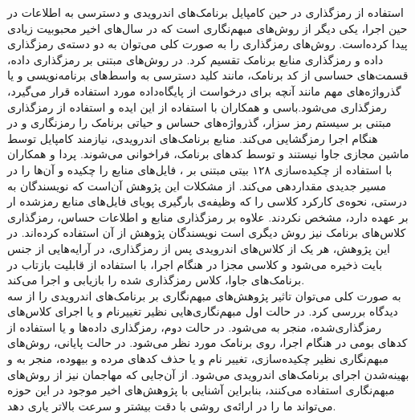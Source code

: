 استفاده از رمزگذاری در حین کامپایل برنامک‌های اندرویدی و دسترسی به اطلاعات در حین اجرا، یکی دیگر از روش‌های مبهم‌نگاری است که در سال‌های اخیر محبوبیت زیادی پیدا کرده‌است. روش‌های رمز‌گذاری را به صورت کلی می‌توان به دو دسته‌ی رمز‌گذاری داده و رمزگذاری منابع برنامک تقسیم کرد. در روش‌های مبتنی بر رمز‌گذاری داده، قسمت‌های حساسی از کد برنامک، مانند کلید‌ دسترسی به واسط‌های برنامه‌نویسی و یا گذرواژه‌های مهم مانند آنچه برای درخواست از پایگاه‌داده مورد استفاده قرار می‌گیرد، رمز‌گذاری می‌شود.باسی و همکاران با استفاده از این ایده و استفاده از رمز‌گذاری مبتنی بر سیستم رمز سزار‌، گذرواژه‌های حساس و حیاتی برنامک را رمزنگاری و در هنگام اجرا رمز‌گشایی می‌کند. منابع برنامک‌های اندرویدی، نیازمند کامپایل توسط ماشین مجازی جاوا نیستند و توسط کد‌های برنامک، فراخوانی می‌شوند. پردا و همکاران با استفاده از چکیده‌سازی ۱۲۸ بیتی مبتنی بر ، فایل‌های منابع را چکیده و آن‌ها را در مسیر جدیدی مقدار‌دهی می‌کند. از مشکلات این پژوهش آن‌است که نویسندگان به درستی، نحوه‌ی کارکرد کلاسی را که وظیفه‌ی بارگیری پویای فایل‌های منابع رمزشده ار بر عهده دارد، مشخص نکردند. علاوه بر رمز‌گذاری منابع و اطلاعات حساس، رمز‌گذاری کلاس‌های برنامک نیز روش دیگری است نویسندگان پژوهش از آن استفاده کرده‌اند. در این پژوهش، هر یک از کلاس‌های اندرویدی پس از رمز‌گذاری، در آرایه‌هایی از جنس بایت ذخیره می‌شود و کلاسی مجزا در هنگام اجرا، با استفاده از قابلیت بازتاب در برنامک‌های جاوا، کلاس رمز‌گذاری شده را بازیابی و اجرا می‌کند.\\
به صورت کلی می‌توان تاثیر پژوهش‌های مبهم‌نگاری بر برنامک‌های اندرویدی را از سه دید‌گاه بررسی کرد. در حالت اول مبهم‌نگاری‌هایی نظیر تغییرنام و یا اجرای کلاس‌های رمز‌گذاری‌شده، منجر به  می‌شود. در حالت دوم، رمز‌گذاری داده‌ها و یا استفاده از کد‌های بومی در هنگام اجرا،  روی برنامک مورد نظر می‌شود. در حالت پایانی، روش‌های مبهم‌نگاری نظیر چکیده‌سازی، تغییر نام و یا حذف کد‌های مرده و بیهوده، منجر به  و بهینه‌شدن اجرای برنامک‌های اندرویدی می‌شود. از آن‌جایی که مهاجمان نیز از روش‌های مبهم‌نگاری استفاده می‌کنند، بنابراین آشنایی با پژوهش‌های اخیر موجود در این حوزه می‌تواند ما را در ارائه‌ی روشی با دقت بیشتر و سرعت بالاتر یاری دهد.

